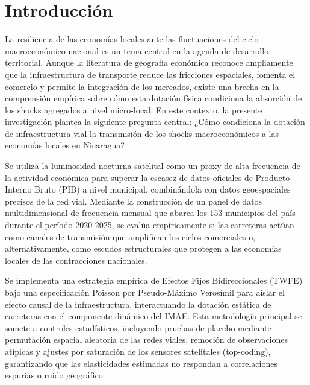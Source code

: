 \documentclass[
  spanish,
  12pt,
  letterpaper]{article}
\begin{document}
\newpage

\section{Introducción}\label{sec-introduccion}

La resiliencia de las economías locales ante las fluctuaciones del ciclo
macroeconómico nacional es un tema central en la agenda de desarrollo
territorial. Aunque la literatura de geografía económica reconoce
ampliamente que la infraestructura de transporte reduce las fricciones
espaciales, fomenta el comercio y permite la integración de los
mercados, existe una brecha en la comprensión empírica sobre cómo esta
dotación física condiciona la absorción de los shocks agregados a nivel
micro-local. En este contexto, la presente investigación plantea la
siguiente pregunta central: ¿Cómo condiciona la dotación de
infraestructura vial la transmisión de los shocks macroeconómicos a las
economías locales en Nicaragua?

Se utiliza la luminosidad nocturna satelital como un proxy de alta
frecuencia de la actividad económica para superar la escasez de datos
oficiales de Producto Interno Bruto (PIB) a nivel municipal,
combinándola con datos geoespaciales precisos de la red vial. Mediante
la construcción de un panel de datos multidimensional de frecuencia
mensual que abarca los 153 municipios del país durante el período
2020-2025, se evalúa empíricamente si las carreteras actúan como canales
de transmisión que amplifican los ciclos comerciales o,
alternativamente, como escudos estructurales que protegen a las
economías locales de las contracciones nacionales.

Se implementa una estrategia empírica de Efectos Fijos Bidireccionales
(TWFE) bajo una especificación Poisson por Pseudo-Máximo Verosímil para
aislar el efecto causal de la infraestructura, interactuando la dotación
estática de carreteras con el componente dinámico del IMAE. Esta
metodología principal se somete a controles estadísticos, incluyendo
pruebas de placebo mediante permutación espacial aleatoria de las redes
viales, remoción de observaciones atípicas y ajustes por saturación de
los sensores satelitales (top-coding), garantizando que las
elasticidades estimadas no respondan a correlaciones espurias o ruido
geográfico.
\end{document}
